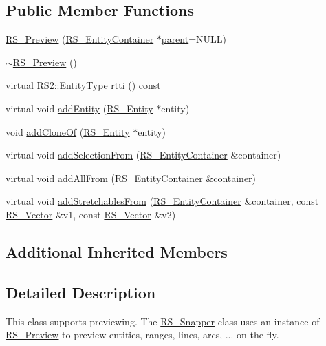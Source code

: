 \subsection*{Public Member Functions}
\begin{DoxyCompactItemize}
\item 
\hyperlink{classRS__Preview_a825e33e7c020406a9099b9192e7babb1}{R\-S\-\_\-\-Preview} (\hyperlink{classRS__EntityContainer}{R\-S\-\_\-\-Entity\-Container} $\ast$\hyperlink{classRS__Entity_a80358a8d2fc6739a516a278dc500b49f}{parent}=N\-U\-L\-L)
\item 
\hyperlink{classRS__Preview_ae179f4a248c41e6987bb2bee35c0a568}{$\sim$\-R\-S\-\_\-\-Preview} ()
\item 
virtual \hyperlink{classRS2_a8f26d1b981e1e85cff16738b43337e6a}{R\-S2\-::\-Entity\-Type} \hyperlink{classRS__Preview_a494a92598b97d2f5b73161e6a9a18521}{rtti} () const 
\item 
virtual void \hyperlink{classRS__Preview_aa9d9ae2f8bcadf12651fb37433d8eb8c}{add\-Entity} (\hyperlink{classRS__Entity}{R\-S\-\_\-\-Entity} $\ast$entity)
\item 
void \hyperlink{classRS__Preview_a7208947384323aa60ef1119c672b4a9a}{add\-Clone\-Of} (\hyperlink{classRS__Entity}{R\-S\-\_\-\-Entity} $\ast$entity)
\item 
virtual void \hyperlink{classRS__Preview_affda5d6c405b0c973bd3dd131dde2915}{add\-Selection\-From} (\hyperlink{classRS__EntityContainer}{R\-S\-\_\-\-Entity\-Container} \&container)
\item 
virtual void \hyperlink{classRS__Preview_a926acfa950b2b99a3503cfb1718a7ab5}{add\-All\-From} (\hyperlink{classRS__EntityContainer}{R\-S\-\_\-\-Entity\-Container} \&container)
\item 
virtual void \hyperlink{classRS__Preview_a37d54f00316aa3799bc5a88c1c5ca786}{add\-Stretchables\-From} (\hyperlink{classRS__EntityContainer}{R\-S\-\_\-\-Entity\-Container} \&container, const \hyperlink{classRS__Vector}{R\-S\-\_\-\-Vector} \&v1, const \hyperlink{classRS__Vector}{R\-S\-\_\-\-Vector} \&v2)
\end{DoxyCompactItemize}
\subsection*{Additional Inherited Members}


\subsection{Detailed Description}
This class supports previewing. The \hyperlink{classRS__Snapper}{R\-S\-\_\-\-Snapper} class uses an instance of \hyperlink{classRS__Preview}{R\-S\-\_\-\-Preview} to preview entities, ranges, lines, arcs, ... on the fly.

